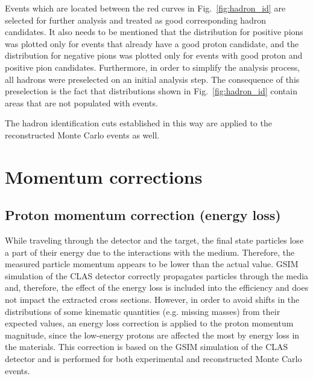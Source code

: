 Events which are located between the red curves in Fig.~\ref{fig:hadron_id} are selected for further analysis and treated as good corresponding hadron candidates. It also needs to be mentioned that the distribution for positive pions was plotted only for events that already have a good proton candidate, and the distribution for negative pions was plotted only for events with good proton and positive pion candidates. Furthermore, in order to simplify the analysis process, all hadrons were preselected on an initial analysis step. The consequence of this preselection is the fact that distributions shown in Fig.~\ref{fig:hadron_id} contain areas that are not populated with events.

The hadron identification cuts established in this way are applied to the reconstructed Monte Carlo events as well. 



\section{Momentum corrections}
\label{Sect:momcorr}

\subsection{Proton momentum correction (energy loss)}
\label{Sect:pr_en_loss}


While traveling through the detector and the target, the final state particles lose a part of their energy due to the interactions with the medium. Therefore, the measured particle momentum appears to be lower than the actual value. GSIM simulation of the CLAS detector correctly propagates particles  through the media and, therefore, the effect of the energy loss is included into the efficiency and does not impact the extracted cross sections. However, in order to avoid shifts in the distributions of some kinematic quantities (e.g. missing masses) from their expected values, an energy loss correction is applied to the proton momentum magnitude, since the low-energy protons are affected the most by energy loss in the materials. This correction is based on the GSIM simulation of the CLAS detector and is performed for both experimental and reconstructed Monte Carlo events.

